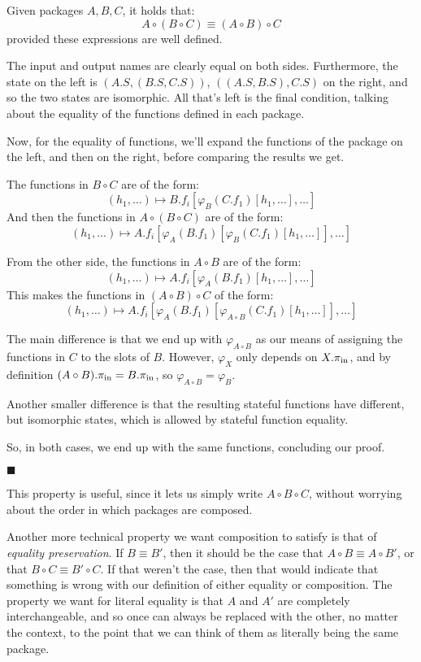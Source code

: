 \begin{lemma}
    Given packages $A, B, C$, it holds that:
    $$
    A \circ (B \circ C) \equiv (A \circ B) \circ C
    $$
    provided these expressions are well defined.

     The input and output names are clearly equal on both sides.
    Furthermore, the state on the left is $(A.S, (B.S, C.S))$,
    $((A.S, B.S), C.S)$ on the right, and so the two states are isomorphic.
    All that's left is the final condition, talking about the equality
    of the functions defined in each package.

    Now, for the equality of functions, we'll expand the functions
    of the package on the left, and then on the right, before comparing
    the results we get.

    The functions in $B \circ C$ are of the form:
    $$
    (h_1, \ldots) \mapsto B.f_i[\varphi_{B}(C.f_1)[h_1, \ldots], \ldots]
    $$
    And then the functions in $A \circ (B \circ C)$ are of the form:
    $$
    (h_1, \ldots) \mapsto A.f_i[\varphi_{A}(B.f_1)[\varphi_{B}(C.f_1)[h_1, \ldots]], \ldots]
    $$

    From the other side, the functions in $A \circ B$ are of the form:
    $$
    (h_1, \ldots) \mapsto A.f_i[\varphi_{A}(B.f_1)[h_1, \ldots], \ldots]
    $$
    This makes the functions in $(A \circ B) \circ C$ of the form:
    $$
    (h_1, \ldots) \mapsto A.f_i[\varphi_{A}(B.f_1)[\varphi_{A \circ B}(C.f_1)[h_1, \ldots]], \ldots]
    $$

    The main difference is that we end up with $\varphi_{A \circ B}$
    as our means of assigning the functions in $C$ to the slots
    of $B$.
    However, $\varphi_{X}$ only depends on $X.\pi_{\text{in}}$,
    and by definition $(A \circ B).\pi_{\text{in}} = B.\pi_{\text{in}}$,
    so $\varphi_{A \circ B} = \varphi_B$.

    Another smaller difference is that the resulting stateful functions
    have different, but isomorphic states, which is allowed
    by stateful function equality.

    So, in both cases, we end up with the same functions, concluding
    our proof.

    $\blacksquare$
\end{lemma}

This property is useful, since it lets us simply write $A \circ B \circ C$,
without worrying about the order in which packages are composed.

Another more technical property we want composition to satisfy is
that of \emph{equality preservation}.
If $B \equiv B'$, then it should be the case that $A \circ B \equiv A \circ B'$,
or that $B \circ C \equiv B' \circ C$.
If that weren't the case, then that would indicate that something is wrong
with our definition of either equality or composition.
The property we want for literal equality is that $A$ and $A'$ are completely
interchangeable, and so once can always be replaced with the other, no matter
the context, to the point that we can think of them as literally being the same
package.

